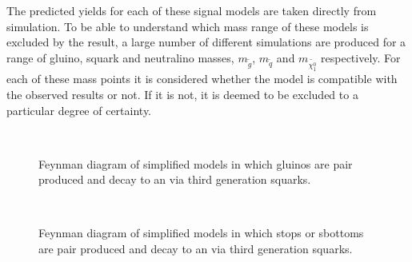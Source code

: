 The predicted yields for each of these signal models are taken
directly from \MC simulation. To be able to understand which mass
range of these models is excluded by the result, a large number of
different simulations are produced for a range of gluino, squark and
neutralino masses, $m_{\tilde{g}}$, $m_{\tilde{q}}$ and
$m_{\tilde{\chi^0_1}}$ respectively. For each of these mass points it
is considered whether the model is compatible with the observed
results or not. If it is not, it is deemed to be excluded to a
particular
degree of certainty.

\begin{figure}[h!]
  \begin{center}
     ~~
     ~~
    \caption{
      Feynman diagram of simplified models in which gluinos are pair
      produced and decay to an \LSP via third generation squarks. 
    }
    \label{fig:simplified-models-feyn-gluino}
  \end{center}
\end{figure}

\begin{figure}[h!]
  \begin{center}
     ~~
    \caption{
      Feynman diagram of simplified models in which stops or sbottoms are pair
      produced and decay to an \LSP via third generation squarks. 
    }
    \label{fig:simplified-models-feyn-3rdGen}
  \end{center}
\end{figure}

